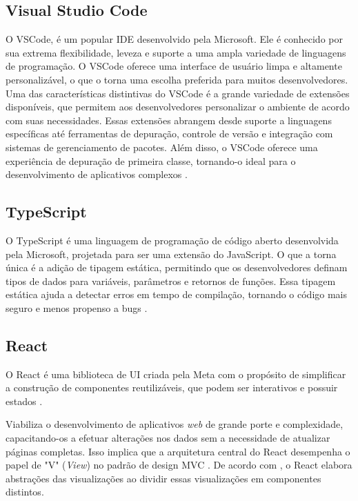 \subsection{Visual Studio Code}\label{subsec:vscode}

O \gls{VSCode}, é um popular \gls{IDE} desenvolvido pela Microsoft. Ele é conhecido por sua extrema flexibilidade, leveza e suporte a uma ampla variedade de linguagens de programação. O \gls{VSCode} oferece uma interface de usuário limpa e altamente personalizável, o que o torna uma escolha preferida para muitos desenvolvedores. Uma das características distintivas do \gls{VSCode} é a grande variedade de extensões disponíveis, que permitem aos desenvolvedores personalizar o ambiente de acordo com suas necessidades. Essas extensões abrangem desde suporte a linguagens específicas até ferramentas de depuração, controle de versão e integração com sistemas de gerenciamento de pacotes. Além disso, o \gls{VSCode} oferece uma experiência de depuração de primeira classe, tornando-o ideal para o desenvolvimento de aplicativos complexos \cite{Sole:2019:VisualStudioCodeDistilled}.

\subsection{TypeScript}\label{subsec:typescript}

O TypeScript é uma linguagem de programação de código aberto desenvolvida pela Microsoft, projetada para ser uma extensão do JavaScript. O que a torna única é a adição de tipagem estática, permitindo que os desenvolvedores definam tipos de dados para variáveis, parâmetros e retornos de funções. Essa tipagem estática ajuda a detectar erros em tempo de compilação, tornando o código mais seguro e menos propenso a bugs \cite{Bierman:2014:UnderstandingTypeScript}.

\subsection{React}\label{subsec:react}

O React é uma biblioteca de \gls{UI} criada pela Meta com o propósito de simplificar a construção de componentes reutilizáveis, que podem ser interativos e possuir estados \cite{Kumar:2016:ComparativeAnalysisAngularJSReactJS}.

Viabiliza o desenvolvimento de aplicativos \textit{web} de grande porte e complexidade, capacitando-os a efetuar alterações nos dados sem a necessidade de atualizar páginas completas. Isso implica que a arquitetura central do React desempenha o papel de "V" (\textit{View}) no padrão de design \gls{MVC} \cite{Aggarwal:2018:ModernWebDevelopmentUsingReactJS}. De acordo com , o React elabora abstrações das visualizações ao dividir essas visualizações em componentes distintos.

